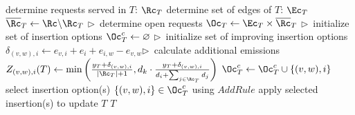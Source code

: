 	\begin{algorithmic}[1]
		\State determine requests served in $T$: $\Rc_T$ 
		\State determine set of edges of $T$: $\Ec_T$
		\State $\overline{\Rc}_T \leftarrow \Rc\backslash\Rc_T$    {\hfill \small \hspace{.6cm}$\triangleright \,$ determine open requests}
		\State $\Oc_T \leftarrow \Ec_T \times \overline{\Rc}_T$ {\hfill \small \hspace{.6cm}$\triangleright \,$ initialize set of insertion options }		
		\State $\Oc_T^c \leftarrow \varnothing$ {\hfill \small \hspace{.6cm}$\triangleright \,$ initialize set of improving insertion options }				
			\State $\delta_{(v,w),i} \leftarrow e_{v,i} + e_{i} + e_{i,w} - e_{v,w}${\hfill \small \hspace{.6cm}$\triangleright \,$ calculate additional emissions}
			\State $Z_{(v,w),i}(T) \leftarrow \min\left(\frac{y_T + \delta_{(v,w),i}}{|\Rc_T| + 1}, d_{k} \cdot \frac{y_T + \delta_{(v,w),i}}{d_{i} + \sum_{j \in \Rc_T} d_{j}}\right)$ 
				\State $\Oc_T^c \leftarrow \Oc_T^c \cup \{(v,w),i\}$
			\EndIf
		\EndFor
		\State select insertion option(s) $\{(v,w),i\} \in \Oc_T^c$ using $AddRule$
		\State apply selected insertion(s) to update $T$
		\State \Return $T$
		
		\EndProcedure
	\end{algorithmic}

